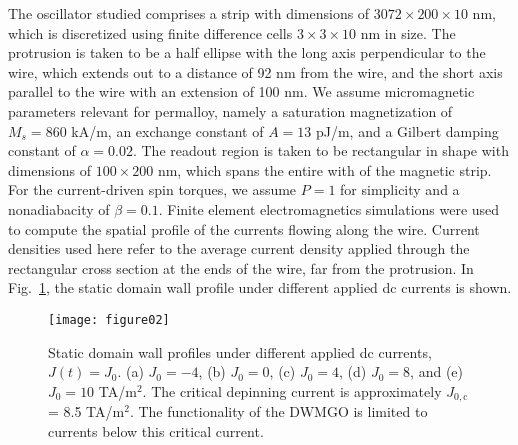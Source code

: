 \documentclass[aip,reprint,amsmath,amssymb,floatfix,superscriptaddress]{revtex4-1}
\begin{document}
The oscillator studied comprises a strip with dimensions of $3072 \times 200 \times 10$ nm, which is discretized using finite difference cells $3 \times 3 \times 10$ nm in size. The protrusion is taken to be a half ellipse with the long axis perpendicular to the wire, which extends out to a distance of 92 nm from the wire, and the short axis parallel to the wire with an extension of 100 nm. We assume micromagnetic parameters relevant for permalloy, namely a saturation magnetization of $M_s = 860$ kA/m, an exchange constant of $A = 13$ pJ/m, and a Gilbert damping constant of $\alpha = 0.02$. The readout region is taken to be rectangular in shape with dimensions of $100 \times 200$ nm, which spans the entire with of the magnetic strip. For the current-driven spin torques, we assume $P = 1$ for simplicity and a nonadiabacity of $\beta = 0.1$. Finite element electromagnetics simulations were used to compute the spatial profile of the currents flowing along the wire. Current densities used here refer to the average current density applied through the rectangular cross section at the ends of the wire, far from the protrusion. In Fig.~\ref{fig:DW_config}, the static domain wall profile under different applied dc currents is shown.
%
\begin{figure}
\centering\texttt{[image: figure02]}
\caption{Static domain wall profiles under different applied dc currents, $J(t) = J_0$. (a) $J_0 = -4$, (b) $J_0 = 0$, (c) $J_0 = 4$, (d) $J_0 = 8$, and (e) $J_0 = 10$ TA/m$^2$. The critical depinning current is approximately $J_{0,\mathrm{c}}$ = 8.5 TA/m$^2$. The functionality of the DWMGO is limited to currents below this critical current.}
\label{fig:DW_config}
\end{figure}
%
\end{document}
